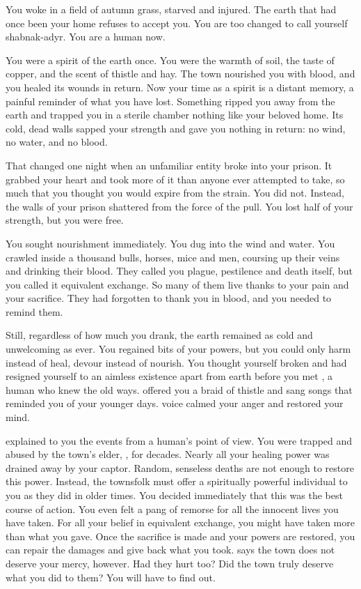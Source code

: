\documentclass[char]{Pestilence}
\begin{document}
\name{\cPlaguebearer{}}

You woke in a field of autumn grass, starved and injured. The earth that had once been your home refuses to accept you. You are too changed to call yourself shabnak-adyr. You are a human now.

You were a spirit of the earth once. You were the warmth of soil, the taste of copper, and the scent of thistle and hay. The town nourished you with blood, and you healed its wounds in return. Now your time as a spirit is a distant memory, a painful reminder of what you have lost. Something ripped you away from the earth and trapped you in a sterile chamber nothing like your beloved home. Its cold, dead walls sapped your strength and gave you nothing in return: no wind, no water, and no blood.

That changed one night when an unfamiliar entity broke into your prison. It grabbed your heart and took more of it than anyone ever attempted to take, so much that you thought you would expire from the strain. You did not. Instead, the walls of your prison shattered from the force of the pull. You lost half of your strength, but you were free. 

You sought nourishment immediately. You dug into the wind and water. You crawled inside a thousand bulls, horses, mice and men, coursing up their veins and drinking their blood. They called you plague, pestilence and death itself, but you called it equivalent exchange. So many of them live thanks to your pain and your sacrifice. They had forgotten to thank you in blood, and you needed to remind them.

Still, regardless of how much you drank, the earth remained as cold and unwelcoming as ever. You regained bits of your powers, but you could only harm instead of heal, devour instead of nourish. You thought yourself broken and had resigned yourself to an aimless existence apart from earth before you met \cShaman{}, a human \cShaman{\human} who knew the old ways. \cShaman{\They} offered you a braid of thistle and sang songs that reminded you of your younger days. \cShaman{\Their} voice calmed your anger and restored your mind.

\cShaman{} explained to you the events from a human's point of view. You were trapped and abused by the town's elder, \cElder{\intro}, for decades. Nearly all your healing power was drained away by your captor. Random, senseless deaths are not enough to restore this power. Instead, the townsfolk must offer a spiritually powerful individual to you as they did in older times. You decided immediately that this was the best course of action. You even felt a pang of remorse for all the innocent lives you have taken. For all your belief in equivalent exchange, you might have taken more than what you gave. Once the sacrifice is made and your powers are restored, you can repair the damages and give back what you took. \cShaman{} says the town does not deserve your mercy, however. Had they hurt \cShaman{\them} too? Did the town truly deserve what you did to them? You will have to find out.
\end{document}
